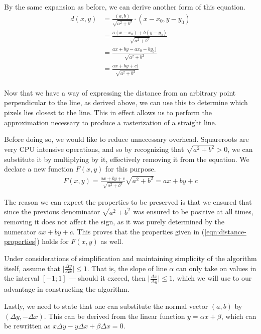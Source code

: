 \documentclass[11pt]{article}
\begin{document}
By the same expansion as before, we can derive another form of this equation.
\begin{align}
    d(x,y)
    &= \frac{(a,b)}{\sqrt{a^2 + b^2}} \cdot (x - x_0, y - y_0) \\
    &= \frac{a(x - x_0) + b(y - y_0)}{\sqrt{a^2 + b^2}} \\
    &= \frac{ax + by - ax_0 - by_0)}{\sqrt{a^2 + b^2}} \\
    &= \frac{ax + by + c)}{\sqrt{a^2 + b^2}} \\
\end{align}

Now that we have a way of expressing the distance from an arbitrary point
perpendicular to the line, as derived above, we can use this to determine
which pixels lies closest to the line. This in effect allows us to perform the
approximation necessary to produce a rasterization of a straight line.

Before doing so, we would like to reduce unnecessary overhead. Squareroots
are very CPU intensive operations, and so by recognizing that
$\sqrt{a^2 + b^2} > 0$, we can substitute it by multiplying by it, effectively
removing it from the equation. We declare a new function $F(x,y)$ for this
purpose.
\begin{align}
    F(x,y)
    = \frac{ax + by + c}{\sqrt{a^2 + b^2}} \sqrt{a^2 + b^2}
    = ax + by + c
\end{align}

The reason we can expect the properties to be preserved is that we ensured
that since the previous denominator $\sqrt{a^2 + b^2}$ was ensured to be
positive at all times, removing it does not affect the sign, as it was purely
determined by the numerator $ax + by + c$. This proves that the properties
given in (\ref{eqn:distance-properties}) holds for $F(x,y)$ as well.

Under considerations of simplification and maintaining simplicity of the
algorithm itself, assume that $\lvert\frac{\Delta y}{\Delta x}\rvert \leq 1$.
That is, the slope of line $\alpha$ can only take on values in the interval
$[-1;1]$ --- should it exceed, then $\lvert\frac{\Delta x}{\Delta y}\rvert
\leq 1$, which we will use to our advantage in constructing the algorithm. 

Lastly, we need to state that one can substitute the normal vector $(a,b)$ by
$(\Delta y, -\Delta x)$. This can be derived from the linear function $y =
\alpha x + \beta$, which can be rewritten as $x \Delta y - y \Delta x + \beta
\Delta x = 0$.
\end{document}
